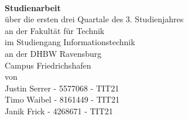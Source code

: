 \begin{titlepage}
	\begin{minipage}{6in}
	\vspace*{-2cm}
    \centering
    \raisebox{-0.5\height}{}
    \hfill
    \end{minipage}
	\begin{center}
		\vspace*{0.5cm}
		\LARGE\textbf{\myTopic}\\
		\vspace*{2cm}
		\textbf{Studienarbeit}\\
		\normalsize
		über die ersten drei Quartale des 3. Studienjahres\\
		\vspace*{1.3cm}
		an der Fakultät für Technik\\
		im Studiengang Informationstechnik\\
		\vspace*{1cm}
		an der DHBW Ravensburg\\
		Campus Friedrichshafen\\
		\vspace*{1cm}
		von\\
		Justin Serrer - 5577068 - TIT21 \\ 
		Timo Waibel - 8161449 - TIT21 \\
		Janik Frick - 4268671 - TIT21 \\
		\vspace*{2cm}
		\vfill
	\end{center}
	\begin{tabular}{ll}
	\end{tabular}
\end{titlepage}

\newpage
